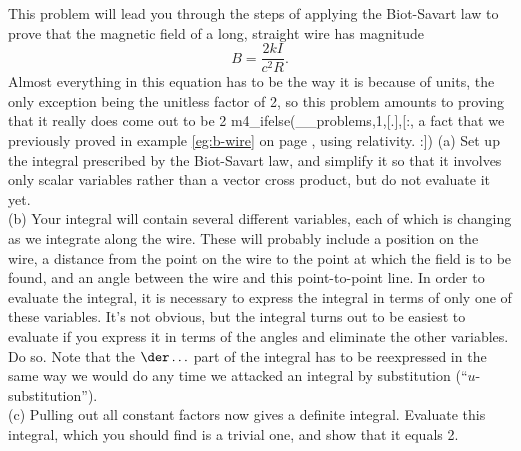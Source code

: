 This problem will lead you through the steps of applying the Biot-Savart law to prove that the
magnetic field of a long, straight wire has magnitude
\begin{equation*}
  B = \frac{2 kI}{ c^2 R}.
\end{equation*}
Almost everything in this equation has to be the way it is because of units, the only
exception being the unitless factor of 2, so this problem amounts to proving that it
really does come out to be 2%
m4_ifelse(__problems,1,[.],[:,
  a fact that we previously proved in example \ref{eg:b-wire} on page
  \pageref{eg:b-wire}, using relativity.
:])
(a) Set up the integral prescribed by the Biot-Savart law, and simplify it so that it involves
only scalar variables rather than a vector cross product, but do not evaluate it yet.\\
(b) Your integral will contain several different variables, each of which is changing as
we integrate along the wire. These will probably include a position on the wire,
a distance from the point on the wire to the point at which the field is to be found,
and an angle between the wire and this point-to-point line. In order to evaluate the integral,
it is necessary to express the integral in terms of only one of these variables. It's not obvious,
but the integral turns out to be easiest to evaluate if you express it in terms of the angles
and eliminate the other variables. Do so. Note that the $\der\ldots$ part of the integral has
to be reexpressed in the same way we would do any time we attacked an integral by substitution
(``$u$-substitution'').\\
(c) Pulling out all constant factors now gives a definite integral. Evaluate this integral,
which you should find is a trivial one, and show that it equals 2.


